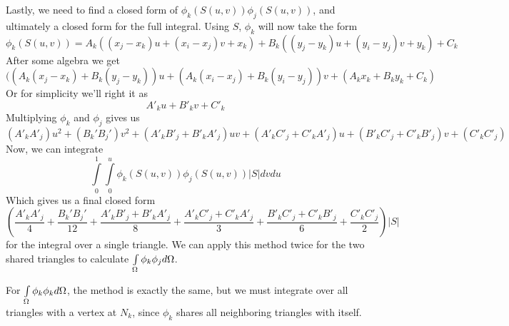 Lastly, we need to find a closed form of $\phi_k(S(u,v))\phi_j(S(u,v))$, and ultimately a closed form for the full
integral. Using $S$, $\phi_k$ will now take the form
\begin{equation}
\phi_k(S(u,v)) = A_k ((x_j - x_k)u + (x_i - x_j)v + x_k) + B_k((y_j - y_k)u + (y_i - y_j)v + y_k) + C_k
\end{equation}
After some algebra we get
\begin{equation}
((A_k(x_j-x_k) + B_k(y_j-y_k))u + (A_k(x_i-x_j) + B_k(y_i-y_j))v + (A_k x_k + B_k y_k + C_k)
\end{equation}
Or for simplicity we'll right it as
\begin{equation}
A'_k u + B'_k v + C'_k
\end{equation}
Multiplying $\phi_k$ and $\phi_j$ gives us
\begin{equation}
(A'_k A'_j)u^2 + (B_k'B_j')v^2 + (A'_k B'_j + B'_k A'_j)uv + (A'_k C'_j + C'_k A'_j)u
+ (B'_kC'_j + C'_kB'_j)v + (C'_k C'_j)
\end{equation}
Now, we can integrate
\begin{equation}
\int\limits_0^1\int\limits_0^u \phi_k(S(u,v)) \phi_j(S(u,v)) |S| dvdu
\end{equation}
Which gives us a final closed form
\begin{equation}
\left(\frac{A'_k A'_j}{4} + \frac{B_k'B_j'}{12} + \frac{A'_k B'_j + B'_k A'_j}{8} +
\frac{A'_k C'_j + C'_k A'_j}{3} + \frac{B'_kC'_j + C'_kB'_j}{6} + \frac{C'_k C'_j}{2}
\right) |S|
\end{equation}
for the integral over a single triangle. We can apply this method twice for the two shared triangles to calculate
$\int\limits_{\Omega} \phi_k \phi_j d\Omega$.

For $\int\limits_{\Omega} \phi_k \phi_k d\Omega$, the method is exactly the same, but we must integrate over all triangles with a
vertex at $N_k$, since $\phi_k$ shares all neighboring triangles with itself.
